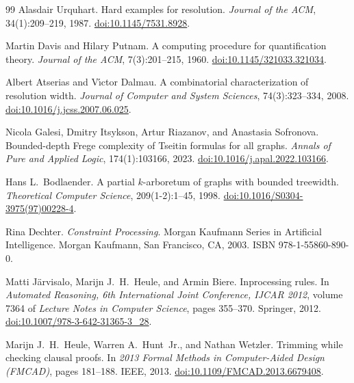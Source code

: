 \documentclass[11pt,a4paper]{article}
\theoremstyle{remark}
\begin{document}
{\begin{thebibliography}{99}
Alasdair Urquhart.
\newblock Hard examples for resolution.
\newblock \emph{Journal of the ACM}, 34(1):209--219, 1987.
\newblock \href{https://doi.org/10.1145/7531.8928}{doi:10.1145/7531.8928}.

Martin Davis and Hilary Putnam.
\newblock A computing procedure for quantification theory.
\newblock \emph{Journal of the ACM}, 7(3):201--215, 1960.
\newblock \href{https://doi.org/10.1145/321033.321034}{doi:10.1145/321033.321034}.

Albert Atserias and V\'\i ctor Dalmau.
\newblock A combinatorial characterization of resolution width.
\newblock \emph{Journal of Computer and System Sciences}, 74(3):323--334, 2008.
\newblock \href{https://doi.org/10.1016/j.jcss.2007.06.025}{doi:10.1016/j.jcss.2007.06.025}.

Nicola Galesi, Dmitry Itsykson, Artur Riazanov, and Anastasia Sofronova.
\newblock Bounded-depth Frege complexity of Tseitin formulas for all graphs.
\newblock \emph{Annals of Pure and Applied Logic}, 174(1):103166, 2023.
\newblock \href{https://doi.org/10.1016/j.apal.2022.103166}{doi:10.1016/j.apal.2022.103166}.

Hans L.\ Bodlaender.
\newblock A partial $k$-arboretum of graphs with bounded treewidth.
\newblock \emph{Theoretical Computer Science}, 209(1-2):1--45, 1998.
\newblock \href{https://doi.org/10.1016/S0304-3975(97)00228-4}{doi:10.1016/S0304-3975(97)00228-4}.

Rina Dechter.
\newblock \emph{Constraint Processing}.
\newblock Morgan Kaufmann Series in Artificial Intelligence. Morgan Kaufmann,
San Francisco, CA, 2003.
\newblock ISBN 978-1-55860-890-0.

Matti J\"arvisalo, Marijn J.~H.\ Heule, and Armin Biere.
\newblock Inprocessing rules.
\newblock In \emph{Automated Reasoning, 6th International Joint Conference,
IJCAR 2012}, volume 7364 of \emph{Lecture Notes in Computer Science}, pages
355--370. Springer, 2012.
\newblock \href{https://doi.org/10.1007/978-3-642-31365-3_28}{doi:10.1007/978-3-642-31365-3\_28}.

Marijn J.~H.\ Heule, Warren A.\ Hunt~Jr., and Nathan Wetzler.
\newblock Trimming while checking clausal proofs.
\newblock In \emph{2013 Formal Methods in Computer-Aided Design (FMCAD)},
pages 181--188. IEEE, 2013.
\newblock \href{https://doi.org/10.1109/FMCAD.2013.6679408}{doi:10.1109/FMCAD.2013.6679408}.


\end{thebibliography}}
\end{document}
